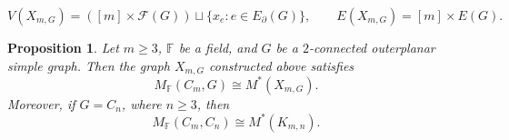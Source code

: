 \documentclass[10pt,a4paper]{amsart}
\providecommand{\F}{\mathbb F}
\numberwithin{equation}{section}
\newtheorem{proposition}[proposition]{Proposition}
\theoremstyle{definition}
\theoremstyle{remark}
\begin{document}
\setcounter{section}{3}
\setcounter{theorem}{4}
\setcounter{equation}{3}
\begin{equation}\label{eq:vertex-edge}
V(X_{m,G})=([m]\times\mathcal F(G))\sqcup\{x_e:e\in E_\partial(G)\},\qquad E(X_{m,G})=[m]\times E(G).
\end{equation}

\begin{proposition}
\label{prop:outerplanar-cographic}
Let \(m\ge3\), \(\F\) be a field, and \(G\) be a \(2\)-connected outerplanar simple graph.  Then the graph \(X_{m,G}\) constructed above satisfies
\[
M_{\F}(C_m,G)\cong M^*(X_{m,G}).
\]
Moreover, if \(G=C_n\), where \(n\ge3\), then
\begin{equation}\label{eq:two-cycle-identity}
 M_{\F}(C_m,C_n)\cong M^*(K_{m,n}).
\end{equation}
\end{proposition}
\end{document}

